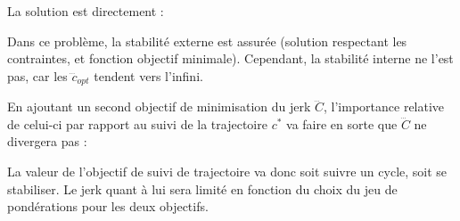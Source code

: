 \documentclass[12pt]{report}
\begin{document}
La solution est directement :

Dans ce problème, la stabilité externe est assurée (solution respectant les contraintes, et fonction objectif minimale). Cependant, la stabilité interne ne l'est pas, car les $\dddot{c}_{opt}$ tendent vers l'infini.

En ajoutant un second objectif de minimisation du jerk $\dddot{C}$, l'importance relative de celui-ci par rapport au suivi de la trajectoire $c^*$ va faire en sorte que $\dddot{C}$ ne divergera pas :

La valeur de l'objectif de suivi de trajectoire va donc soit suivre un cycle, soit se stabiliser. Le jerk quant à lui sera limité en fonction du choix du jeu de pondérations pour les deux objectifs.
\end{document}
